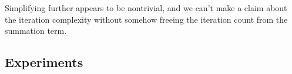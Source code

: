 \documentclass[11pt]{article}
\begin{document}
Simplifying further appears to be nontrivial, and we can't make a claim about the iteration complexity without somehow freeing the iteration count from the summation term.

\subsection{Experiments}








\end{document}
